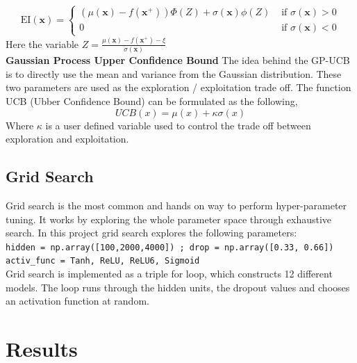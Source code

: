 \documentclass[12pt,fleqn]{article}
\begin{document}
\begin{equation*}
\mathrm{EI}(\mathbf{x})=\left\{\begin{array}{ll}
\left(\mu(\mathbf{x})-f\left(\mathbf{x}^{+}\right)\right) \Phi(Z)+\sigma(\mathbf{x}) \phi(Z) & \text { if } \sigma(\mathbf{x})>0 \\
0 & \text { if } \sigma(\mathbf{x})<0
\end{array}\right. 
\end{equation*}
Here the variable $ Z = \frac{\mu(\mathbf{x}) - f(\mathbf{x}^+) - \xi }{\sigma(\mathbf{x})} $ \newline 
\\
\textbf{Gaussian Process Upper Confidence Bound} \newline
The idea behind the GP-UCB is to directly use the mean and variance from the Gaussian distribution. These two parameters are used as the exploration / exploitation trade off. The function UCB (Ubber Confidence Bound) can be formulated as the following, 
\begin{equation*}
UCB(x) = \mu(x) + \kappa \sigma(x)
\end{equation*}
\noindent
Where $ \kappa $ is a user defined variable used to control the trade off between exploration and exploitation. \newline

\subsection*{Grid Search}

Grid search is the most common and hands on way to perform hyper-parameter tuning. It works by exploring the whole parameter space through exhaustive search. In this project grid search explores the following parameters:\\
	\indent \indent \texttt{hidden = np.array([100,2000,4000]) ; drop = np.array([0.33, 0.66])\\
 \indent \indent activ\_func = {Tanh, ReLU, ReLU6, Sigmoid} } \\
Grid search is implemented as a triple for loop, which constructs 12 different models. The loop runs through the hidden units, the dropout values and chooses an activation function at random. 

\section{Results}
\end{document}
